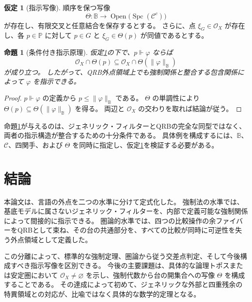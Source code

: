 \documentclass[11pt]{ltjsarticle}
\theoremstyle{plain}
\newtheorem{proposition}[theorem]{命題}
\theoremstyle{definition}
\newtheorem{assumption}[theorem]{仮定}
\newcommand{\Spc}{\operatorname{Spc}}
\begin{document}
\begin{assumption}[指示写像]\label{ass:designation}
順序を保つ写像
\[
\Theta\colon\mathbb{B}\longrightarrow
\operatorname{Open}\!\bigl(\Spc(\mathcal{C}^c)\bigr)
\]
が存在し、有限交叉と任意結合を保存するとする。
さらに、点 \(\xi_G\in\mathcal O_X\) が存在し、各 \(p\in\mathbb P\) に対して
\(p\in G\) と \(\xi_G\in\Theta(p)\) が同値であるとする。
\end{assumption}

\begin{proposition}[条件付き指示原理]\label{prop:designation}
仮定\ref{ass:designation}の下で、\(p\Vdash\varphi\) ならば
\[
\mathcal{O}_X\cap\Theta(p)
\subseteq
\mathcal{O}_X\cap\Theta\!\left(\lVert\varphi\rVert_{\mathbb B}\right)
\]
が成り立つ。
したがって、QRB外点領域上でも強制関係と整合する包含関係によって \(\varphi\) を指示できる。
\end{proposition}

\begin{proof}
\(p\Vdash\varphi\) の定義から \(p\leq\lVert\varphi\rVert_{\mathbb B}\) である。
\(\Theta\) の単調性により
\(\Theta(p)\subseteq\Theta(\lVert\varphi\rVert_{\mathbb B})\) を得る。
両辺と \(\mathcal{O}_X\) の交わりを取れば結論が従う。
\end{proof}

命題\ref{prop:designation}が与えるのは、ジェネリック・フィルターとQRBの完全な同型ではなく、両者の指示構造が整合するための十分条件である。
具体例を構成するには、\(\mathbb B\)、\(\mathcal C\)、四関手、および \(\Theta\) を同時に指定し、仮定\ref{ass:designation}を検証する必要がある。

\section{結論}
\label{sec:conclusion}

本論文は、言語の外点を二つの水準に分けて定式化した。
強制法の水準では、基底モデルに属さないジェネリック・フィルターを、内部で定義可能な強制関係によって間接的に指示できる。
圏論的水準では、四つの比較操作の余ファイバーをQRBとして束ね、その台の共通部分を、すべての比較が同時に可逆性を失う外点領域として定義した。

この分離によって、標準的な強制定理、圏論から従う交差点判定、そして今後構成すべき指示写像を区別できる。
今後の主要課題は、具体的な論理トポスまたは安定圏において \(\mathcal O_X\neq\varnothing\) を示し、強制代数から台の開集合への写像 \(\Theta\) を構成することである。
その達成によって初めて、ジェネリックな外部と四重残余の特異領域との対応が、比喩ではなく具体的な数学的定理となる。
\end{document}
